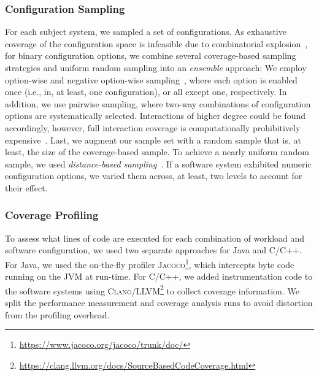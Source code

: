{\subsubsection{Configuration Sampling}\label{sec:sampling}
For each subject system, we sampled a set of configurations. As exhaustive coverage of the configuration space is infeasible due to combinatorial explosion~\cite{henardCombining2015}, for binary configuration options, we combine several coverage-based sampling strategies and uniform random sampling into an \emph{ensemble} approach: 
We employ option-wise and negative option-wise sampling~\cite{siegmundPerformanceinfluenceModelsHighly2015}, where each option is enabled once (i.e., in, at least, one configuration), or all except one, respectively. In addition, we use pairwise sampling, where two-way combinations of configuration options are systematically selected. Interactions of higher degree could be found accordingly, however, full interaction coverage is computationally prohibitively expensive~\cite{henardCombining2015}. 
Last, we augment our sample set with a random sample that is, at least, the size of the coverage-based sample. To achieve a nearly uniform random sample, we used \emph{distance-based sampling}~\cite{kaltenecker_distance-based_2019}. If a software system exhibited numeric configuration options, we varied them across, at least, two levels to account for their effect.

\subsubsection{Coverage Profiling}\label{sec:profiling}
To assess what lines of code are executed for each combination of workload and software configuration, we used two separate approaches for Java and C/C++. For Java, we used the on-the-fly profiler \textsc{Jacoco}\footnote{\url{https://www.jacoco.org/jacoco/trunk/doc/}}, which intercepts byte code running on the JVM at run-time. For C/C++, we added instrumentation code to the software systems using \textsc{Clang/LLVM}\footnote{\url{https://clang.llvm.org/docs/SourceBasedCodeCoverage.html}} to collect coverage information. We split the performance measurement and coverage analysis runs to  avoid distortion from the profiling overhead.
	
}

